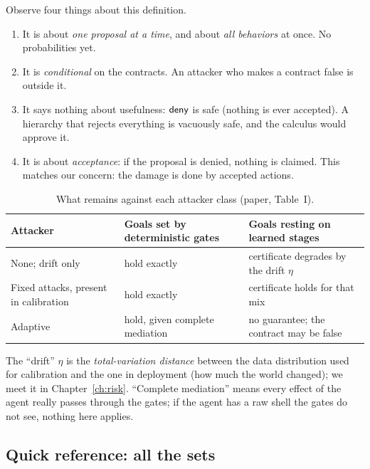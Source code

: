 Observe four things about this definition.

\begin{enumerate}
\item It is about \emph{one proposal at a time}, and about \emph{all behaviors} at once. No probabilities yet.
\item It is \emph{conditional} on the contracts. An attacker who makes a contract false is outside it.
\item It says nothing about usefulness: $\mathsf{deny}$ is safe (nothing is ever accepted). A hierarchy that rejects everything is vacuously safe, and the calculus would approve it.
\item It is about \emph{acceptance}: if the proposal is denied, nothing is claimed. This matches our concern: the damage is done by accepted actions.
\end{enumerate}

\begin{table}[h]
\caption{What remains against each attacker class (paper, Table~I).}
\label{tab:attackers-tut}
\centering
\footnotesize
\renewcommand{\arraystretch}{1.25}
\begin{tabularx}{\textwidth}{@{}p{3.5cm}XX@{}}
\toprule
\textbf{Attacker} & \textbf{Goals set by deterministic gates} & \textbf{Goals resting on learned stages}\\
\midrule
None; drift only & hold exactly & certificate degrades by the drift $\eta$\\
Fixed attacks, present in calibration & hold exactly & certificate holds for that mix\\
Adaptive & hold, given complete mediation & no guarantee; the contract may be false\\
\bottomrule
\end{tabularx}
\end{table}

The ``drift'' $\eta$ is the \emph{total-variation distance} between the data distribution used for calibration and the one in deployment (how much the world changed); we meet it in Chapter~\ref{ch:risk}. ``Complete mediation'' means every effect of the agent really passes through the gates; if the agent has a raw shell the gates do not see, nothing here applies.

\subsection{Quick reference: all the sets}

